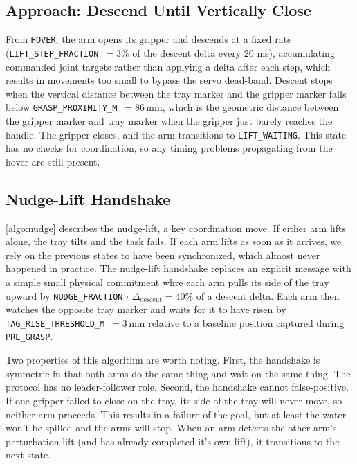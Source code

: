 \subsection{Approach: Descend Until Vertically Close}
From \texttt{HOVER}, the arm opens its gripper and descends at a fixed rate (\texttt{LIFT\_STEP\_FRACTION}~$=3\%$ of the descent delta every 20 ms), accumulating commanded joint targets rather than applying a delta after each step, which results in movements too small to bypass the servo dead-band. Descent stops when the vertical distance between the tray marker and the gripper marker falls below \texttt{GRASP\_PROXIMITY\_M}~$=86$\,mm, which is the geometric distance between the gripper marker and tray marker when
the gripper just barely reaches the handle. The gripper closes, and the arm transitions to \texttt{LIFT\_WAITING}. This state has no checks for coordination, so any 
timing problems propagating from the hover are still present.

\subsection{Nudge-Lift Handshake}
\label{sec:nudge}
\cref{algo:nudge} describes the nudge-lift, a key coordination move. If either arm lifts alone, the tray tilts and the task fails. If each arm lifts as soon as it arrives, we rely on the previous states to have been synchronized, which almost never happened in practice. The nudge-lift handshake replaces an explicit message with a simple small physical commitment whre each arm pulls its side of the tray upward by \texttt{NUDGE\_FRACTION}$\,\cdot\,\Delta_{\text{descent}}=40\%$ of a descent delta. Each arm then watches the opposite tray
marker and waits for it to have risen by
\texttt{TAG\_RISE\_THRESHOLD\_M}~$=3$\,mm relative to a baseline position captured during \texttt{PRE\_GRASP}. 

Two properties of this algorithm are worth noting. First, the handshake is symmetric in that both arms do the same thing and wait on the same thing. The protocol has no leader-follower role. Second, the handshake cannot false-positive. If one gripper failed to close on the tray, its side of the tray will never move, so neither arm proceeds. This results in a failure
of the goal, but at least the water won't be spilled and the arms will stop. When an arm detects the other arm's perturbation lift (and has already completed it's own lift), it transitions to the next state.


